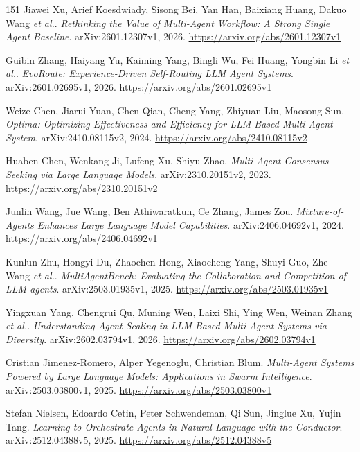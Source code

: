 \documentclass[11pt,a4paper]{article}
\begin{document}
\begin{thebibliography}{151}
Jiawei Xu, Arief Koesdwiady, Sisong Bei, Yan Han, Baixiang Huang, Dakuo Wang \emph{et al.}.
\newblock \emph{Rethinking the Value of Multi-Agent Workflow: A Strong Single Agent Baseline}.
\newblock arXiv:2601.12307v1, 2026.
\newblock \url{https://arxiv.org/abs/2601.12307v1}

Guibin Zhang, Haiyang Yu, Kaiming Yang, Bingli Wu, Fei Huang, Yongbin Li \emph{et al.}.
\newblock \emph{EvoRoute: Experience-Driven Self-Routing LLM Agent Systems}.
\newblock arXiv:2601.02695v1, 2026.
\newblock \url{https://arxiv.org/abs/2601.02695v1}

Weize Chen, Jiarui Yuan, Chen Qian, Cheng Yang, Zhiyuan Liu, Maosong Sun.
\newblock \emph{Optima: Optimizing Effectiveness and Efficiency for LLM-Based Multi-Agent System}.
\newblock arXiv:2410.08115v2, 2024.
\newblock \url{https://arxiv.org/abs/2410.08115v2}

Huaben Chen, Wenkang Ji, Lufeng Xu, Shiyu Zhao.
\newblock \emph{Multi-Agent Consensus Seeking via Large Language Models}.
\newblock arXiv:2310.20151v2, 2023.
\newblock \url{https://arxiv.org/abs/2310.20151v2}

Junlin Wang, Jue Wang, Ben Athiwaratkun, Ce Zhang, James Zou.
\newblock \emph{Mixture-of-Agents Enhances Large Language Model Capabilities}.
\newblock arXiv:2406.04692v1, 2024.
\newblock \url{https://arxiv.org/abs/2406.04692v1}

Kunlun Zhu, Hongyi Du, Zhaochen Hong, Xiaocheng Yang, Shuyi Guo, Zhe Wang \emph{et al.}.
\newblock \emph{MultiAgentBench: Evaluating the Collaboration and Competition of LLM agents}.
\newblock arXiv:2503.01935v1, 2025.
\newblock \url{https://arxiv.org/abs/2503.01935v1}

Yingxuan Yang, Chengrui Qu, Muning Wen, Laixi Shi, Ying Wen, Weinan Zhang \emph{et al.}.
\newblock \emph{Understanding Agent Scaling in LLM-Based Multi-Agent Systems via Diversity}.
\newblock arXiv:2602.03794v1, 2026.
\newblock \url{https://arxiv.org/abs/2602.03794v1}

Cristian Jimenez-Romero, Alper Yegenoglu, Christian Blum.
\newblock \emph{Multi-Agent Systems Powered by Large Language Models: Applications in Swarm Intelligence}.
\newblock arXiv:2503.03800v1, 2025.
\newblock \url{https://arxiv.org/abs/2503.03800v1}

Stefan Nielsen, Edoardo Cetin, Peter Schwendeman, Qi Sun, Jinglue Xu, Yujin Tang.
\newblock \emph{Learning to Orchestrate Agents in Natural Language with the Conductor}.
\newblock arXiv:2512.04388v5, 2025.
\newblock \url{https://arxiv.org/abs/2512.04388v5}


\end{thebibliography}
\end{document}
